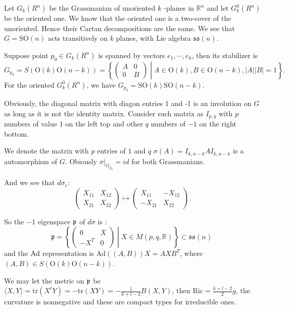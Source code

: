 	Let $G_{k}\left(R^{n}\right)$ be the Grassmanian of
	unoriented $k$ -planes in $\mathbb{R}^{n}$ and let
	$G_{k}^{0}\left(R^{n}\right)$ be the  oriented one. We know
	that the oriented one is a two-cover of the unoriented. Hence
	their Cartan decompositions are the same. We see that
	$G=\mathrm{SO}(n)$  acts transitively on $k$ planes, with Lie
	algebra $\mathfrak{so}(n)$. 
	
	Suppose point $p_{0}\in G_{k}\left(R^{n}\right)$ is spanned
	by vectors $e_{1}, \cdots, e_{k}$, then its stabilizer is
	\[
	G_{p_{0}}=S(\mathrm{O}(k)
	\mathrm{O}(n-k))=\left\{\left(\begin{array}{cc}
		A & 0 \\
		0 & B
	\end{array}\right) \middle| A \in \mathrm{O}(k), B \in
	\mathrm{O}(n-k),|A||B|=1\right\}.
	\]
	For the oriented $G_{k}^{0}\left(R^{n}\right)$, we have
	$G_{p_{0}}=\mathrm{SO}(k) \mathrm{SO}(n-k)$.
	
	Obviously, the diagonal matrix with diagon entries 1 and -1
	is an involution on $G$ as long as it is not the identity
	matrix. Consider such matrix as $I_{p,q}$ with $p$ numbers of
	value $1$ on the left top and other $q$ numbers of $-1$ on the right bottom.
	
	We denote the matrix with $p$ entries of $1$ and $q$
	$\sigma(A)=I_{k, n-k} A I_{k, n-k}$ is a automorphism of $G$.
	Obiously $\sigma|_{G_{p_0}}=id$ for both Grassmanians.

	And we see that $d\sigma_e$:
	\[
	\begin{pmatrix}
		X_{11}&X_{12}\\
		X_{21}&X_{22}
	\end{pmatrix}\mapsto
	\begin{pmatrix}
		X_{11}&-X_{12}\\
		-X_{21}&X_{22}
	\end{pmatrix}.
	\]
	
	
	So the $-1$ eigenspace ${\mathfrak p}$ of $d \sigma$ 
	is :
	\[
	\mathfrak{p}=\left\{\left(\begin{array}{cc}
		0 & X \\
		-X^{T} & 0
	\end{array}\right) \middle| X \in M(p, q, \mathbb{R})\right\}
	\subset\mathfrak{so}(n)\ 
	\]
	and the $\mathrm{Ad}$ representation is $\mathrm{Ad}((A, B)) X=A X B^{T}$, 
	where $(A, B) \in S(\mathrm{O}(k) \mathrm{O}(n-k))$.

	We may let the metric on ${\mathfrak p}$ be $\langle
	X,Y\rangle=\mathrm{tr}(X^tY)=-\mathrm{tr}(XY)=-\frac{1}{k+l-
	2}B(X,Y)$, then $\mathrm{Ric}=\frac{k+l-2}{2}g$, the
	curvature is nonnegative and these are compact types for
	irreducible ones.
	
